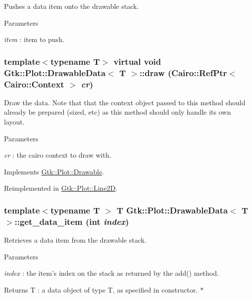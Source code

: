 Pushes a data item onto the drawable stack. 
\begin{DoxyParams}{Parameters}
\item[{\em item}]: item to push. \end{DoxyParams}
\hypertarget{classGtk_1_1Plot_1_1DrawableData_a275c0162df2dfdd060e859b63077614c}{
\subsubsection[{draw}]{\setlength{\rightskip}{0pt plus 5cm}template$<$typename T$>$ virtual void {\bf Gtk::Plot::DrawableData}$<$ T $>$::draw (Cairo::RefPtr$<$ Cairo::Context $>$ {\em cr})}}
\label{classGtk_1_1Plot_1_1DrawableData_a275c0162df2dfdd060e859b63077614c}


Draw the data. Note that that the context object passed to this method should already be prepared (sized, etc) as this method should only handle its own layout. 
\begin{DoxyParams}{Parameters}
\item[{\em cr}]: the cairo context to draw with. \end{DoxyParams}


Implements \hyperlink{classGtk_1_1Plot_1_1Drawable_ab1c723fcea852515f17d933e66b63ed2}{Gtk::Plot::Drawable}.

Reimplemented in \hyperlink{classGtk_1_1Plot_1_1Line2D_a4f5fc46b03bac4dc0a87fe7dd4945cf1}{Gtk::Plot::Line2D}.\hypertarget{classGtk_1_1Plot_1_1DrawableData_aa36c69486f3b90c92a64ff9e26848858}{
\subsubsection[{get\_\-data\_\-item}]{\setlength{\rightskip}{0pt plus 5cm}template$<$typename T $>$ T {\bf Gtk::Plot::DrawableData}$<$ T $>$::get\_\-data\_\-item (int {\em index})}}
\label{classGtk_1_1Plot_1_1DrawableData_aa36c69486f3b90c92a64ff9e26848858}


Retrieves a data item from the drawable stack. 
\begin{DoxyParams}{Parameters}
\item[{\em index}]: the item's index on the stack as returned by the add() method. \end{DoxyParams}
\begin{DoxyReturn}{Returns}
T : a data object of type T, as specified in constructor. $\ast$ 
\end{DoxyReturn}

